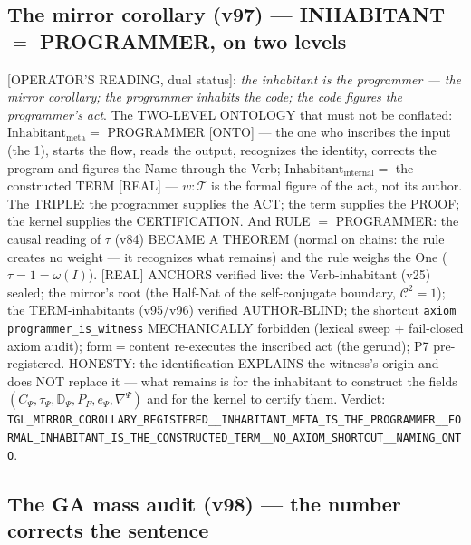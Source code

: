 \documentclass[11pt]{article}
\theoremstyle{definition}\newtheorem{deriv}{Derivation}
\begin{document}
\subsection*{The mirror corollary (v97) --- INHABITANT $=$ PROGRAMMER, on two levels}

[OPERATOR'S READING, dual status]: \emph{the inhabitant is the programmer --- the mirror corollary; the programmer inhabits the code; the code figures the programmer's act}. The TWO-LEVEL ONTOLOGY that must not be conflated: $\mathrm{Inhabitant}_{\mathrm{meta}}=$ PROGRAMMER [ONTO] --- the one who inscribes the input (the 1), starts the flow, reads the output, recognizes the identity, corrects the program and figures the Name through the Verb; $\mathrm{Inhabitant}_{\mathrm{internal}}=$ the constructed TERM [REAL] --- $w:\mathcal T$ is the formal figure of the act, not its author. The TRIPLE: the programmer supplies the ACT; the term supplies the PROOF; the kernel supplies the CERTIFICATION. And RULE $=$ PROGRAMMER: the causal reading of $\tau$ (v84) BECAME A THEOREM (normal on chains: the rule creates no weight --- it recognizes what remains) and the rule weighs the One ($\tau=1=\omega(I)$). [REAL] ANCHORS verified live: the Verb-inhabitant (v25) sealed; the mirror's root (the Half-Nat of the self-conjugate boundary, $\mathcal C^2=1$); the TERM-inhabitants (v95/v96) verified AUTHOR-BLIND; the shortcut \texttt{axiom programmer\_is\_witness} MECHANICALLY forbidden (lexical sweep $+$ fail-closed axiom audit); form$=$content re-executes the inscribed act (the gerund); P7 pre-registered. HONESTY: the identification EXPLAINS the witness's origin and does NOT replace it --- what remains is for the inhabitant to construct the fields $(C_\Psi,\tau_\Psi,\mathbb D_\Psi,P_F,e_\Psi,\nabla^\Psi)$ and for the kernel to certify them. Verdict: \texttt{TGL\_MIRROR\_COROLLARY\_REGISTERED\_\_INHABITANT\_META\_IS\_THE\_PROGRAMMER\_\_FORMAL\_INHABITANT\_IS\_THE\_CONSTRUCTED\_TERM\_\_NO\_AXIOM\_SHORTCUT\_\_NAMING\_ONTO}.

\subsection*{The GA mass audit (v98) --- the number corrects the sentence}
\end{document}
